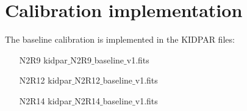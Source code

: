\section{Calibration implementation}

The baseline calibration is implemented in the KIDPAR files:

\begin{itemize}
\item[N2R9]{kidpar$\_$N2R9$\_$baseline$\_$v1.fits}
\item[N2R12]{kidpar$\_$N2R12$\_$baseline$\_$v1.fits}
\item[N2R14]{kidpar$\_$N2R14$\_$baseline$\_$v1.fits}
\end{itemize}
